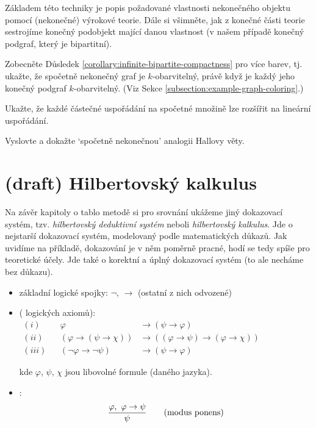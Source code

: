 Základem této techniky je popis požadované vlastnosti nekonečného objektu pomocí (nekonečné) výrokové teorie. Dále si všimněte, jak z konečné části teorie sestrojíme konečný podobjekt mající danou vlastnost (v našem případě konečný podgraf, který je bipartitní).

\begin{exercise}
    Zobecněte Důsledek \ref{corollary:infinite-bipartite-compactness} pro více barev, tj. ukažte, že spočetně nekonečný graf je $k$-obarvitelný, právě když je každý jeho konečný podgraf $k$-obarvitelný. (Viz Sekce \ref{subsection:example-graph-coloring}.)
\end{exercise}

\begin{exercise}
    Ukažte, že každé částečné uspořádání na spočetné množině lze rozšířit na lineární uspořádání.
\end{exercise}

\begin{exercise}
    Vyslovte a dokažte `spočetně nekonečnou' analogii Hallovy věty.
\end{exercise}

\section{(draft) Hilbertovský kalkulus}\label{section:hilbert-calculus-propositional}
\todo
Na závěr kapitoly o tablo metodě si pro srovnání ukážeme jiný dokazovací systém, tzv. \emph{hilbertovský deduktivní systém} neboli \emph{hilbertovský kalkulus}. Jde o nejstarší dokazovací systém, modelovaný podle matematických důkazů. Jak uvidíme na příkladě, dokazování je v něm poměrně pracné, hodí se tedy spíše pro teoretické účely. Jde také o korektní a úplný dokazovací systém (to ale necháme bez důkazu).


\begin{itemize}
    \item základní logické spojky: $\neg$, $\to$ (ostatní z nich odvozené)
    
    \item {} ( logických axiomů):
    \vspace{-2mm}\begin{align*}(i)& &\varphi &\to (\psi \to \varphi) \\
    (ii)& &(\varphi\to (\psi \to \chi))&\to ((\varphi \to \psi)\to(\varphi \to \chi))\qquad\qquad\qquad\qquad\phantom{\ } \\
    (iii)& &(\neg \varphi \to \neg \psi)&\to(\psi \to \varphi)
    \end{align*}
    
    \vspace{-2mm}
    kde $\varphi$, $\psi$, $\chi$ jsou libovolné formule (daného jazyka).
    \item {}:
    \vspace{-3mm}
    $$\frac{\varphi,\ \varphi \to \psi}{\psi}\qquad\text{{(modus ponens)}}$$
    \end{itemize}
    
